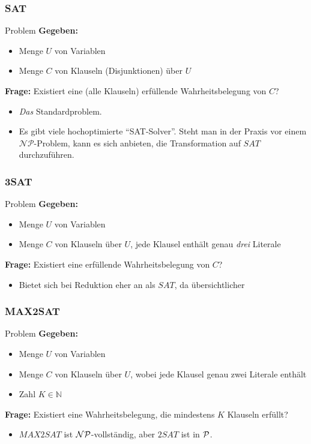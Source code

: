 \begin{frame}
\frametitle{SAT}
\begin{block}{Problem}
\textbf{Gegeben:}
\begin{itemize}
 \item Menge $U$ von Variablen
 \item Menge $C$ von Klauseln (Disjunktionen) über $U$
\end{itemize}
\textbf{Frage:} Existiert eine (alle Klauseln) erfüllende Wahrheitsbelegung von $C$?
\end{block}
\begin{itemize}
\item \emph{Das} Standardproblem.
\item Es gibt viele hochoptimierte "`SAT-Solver"'. Steht man in der Praxis vor einem $\mathcal{NP}$-Problem, kann es sich anbieten, die Transformation auf $SAT$ durchzuführen.
\end{itemize}
\end{frame}
\begin{frame}
\frametitle{3SAT}
\begin{block}{Problem}
\textbf{Gegeben:}
\begin{itemize}
 \item Menge $U$ von Variablen
 \item Menge $C$ von Klauseln über $U$, jede Klausel enthält genau \emph{drei} Literale
\end{itemize}
\textbf{Frage:} Existiert eine erfüllende Wahrheitsbelegung von $C$?
\end{block}
\begin{itemize}
\item Bietet sich bei Reduktion eher an als $SAT$, da übersichtlicher
\end{itemize}
\end{frame}
\begin{frame}
\frametitle{MAX2SAT}
\begin{block}{Problem}
\textbf{Gegeben:}
\begin{itemize}
 \item Menge $U$ von Variablen
 \item Menge $C$ von Klauseln über $U$, wobei jede Klausel genau zwei Literale enthält
 \item Zahl $K \in \mathbb{N}$
\end{itemize}
\textbf{Frage:} Existiert eine Wahrheitsbelegung, die mindestens $K$ Klauseln erfüllt?
\end{block}

\begin{itemize}
	\item $MAX2SAT$ ist $\mathcal{NP}$-vollständig, aber $2SAT$ ist in $\mathcal{P}$.
\end{itemize}
\end{frame}

